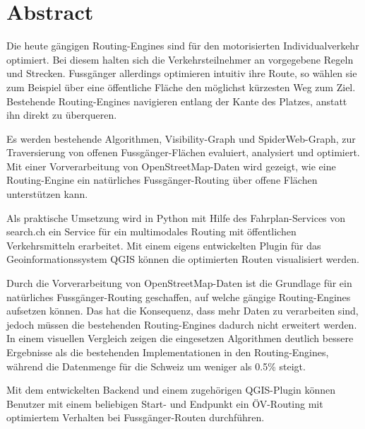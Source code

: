 
\chapter*{Abstract}

Die heute gängigen Routing-Engines sind für den motorisierten Individualverkehr optimiert. Bei diesem halten sich die Verkehrsteilnehmer an vorgegebene Regeln und Strecken. Fussgänger allerdings optimieren intuitiv ihre Route, so wählen sie zum Beispiel über eine öffentliche Fläche den möglichst kürzesten Weg zum Ziel. Bestehende Routing-Engines navigieren entlang der Kante des Platzes, anstatt ihn direkt zu überqueren.

Es werden bestehende Algorithmen, Visibility-Graph und SpiderWeb-Graph, zur Traversierung von offenen Fussgänger-Flächen evaluiert, analysiert und optimiert. Mit einer Vorverarbeitung von OpenStreetMap-Daten wird gezeigt, wie eine Routing-Engine ein natürliches Fussgänger-Routing über offene Flächen unterstützen kann.

Als praktische Umsetzung wird in Python mit Hilfe des Fahrplan-Services von search.ch ein Service für ein multimodales Routing mit öffentlichen Verkehrsmitteln erarbeitet. Mit einem eigens entwickelten Plugin für das Geoinformationssystem QGIS können die optimierten Routen visualisiert werden.

Durch die Vorverarbeitung von OpenStreetMap-Daten ist die Grundlage für ein natürliches Fussgänger-Routing geschaffen, auf welche gängige Routing-Engines aufsetzen können. Das hat die Konsequenz, dass mehr Daten zu verarbeiten sind, jedoch müssen die bestehenden Routing-Engines dadurch nicht erweitert werden. In einem visuellen Vergleich zeigen die eingesetzen Algorithmen  deutlich bessere Ergebnisse als die bestehenden Implementationen in den Routing-Engines, während die Datenmenge für die Schweiz um weniger als 0.5\% steigt.

Mit dem entwickelten Backend und einem zugehörigen QGIS-Plugin können Benutzer mit einem beliebigen Start- und Endpunkt ein ÖV-Routing mit optimiertem Verhalten bei Fussgänger-Routen durchführen.

\cleardoublepage


